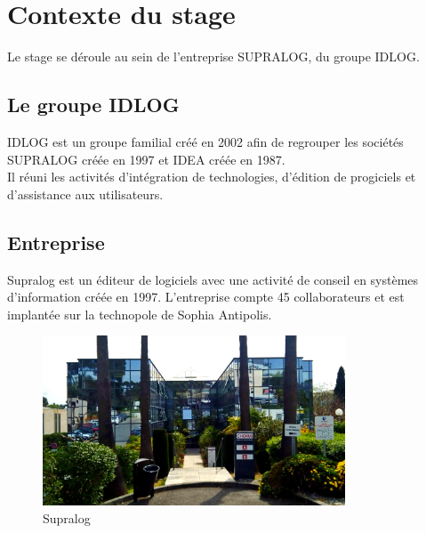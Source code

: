 \newpage


\section{Contexte du stage} %
Le stage se déroule au sein de l'entreprise SUPRALOG, du groupe IDLOG.

\subsection{Le groupe IDLOG}
\gls{IDLOG} est un groupe familial créé en 2002 afin de regrouper les sociétés \gls{SUPRALOG} créée en 1997 et \gls{IDEA} créée en 1987.\\
Il réuni les activités d'intégration de technologies, d’édition de progiciels et d'assistance aux utilisateurs.

\subsection{Entreprise}
Supralog est un éditeur de logiciels avec une activité de conseil en systèmes d'information créée en 1997.
L'entreprise compte 45 collaborateurs et est implantée sur la technopole de Sophia Antipolis.

\begin{figure}[H]
  \centering
  \includegraphics[width=9cm]{./img/supralog_building_3}
  \caption{\label{fig:mb_va_ast} Supralog}
\end{figure}


